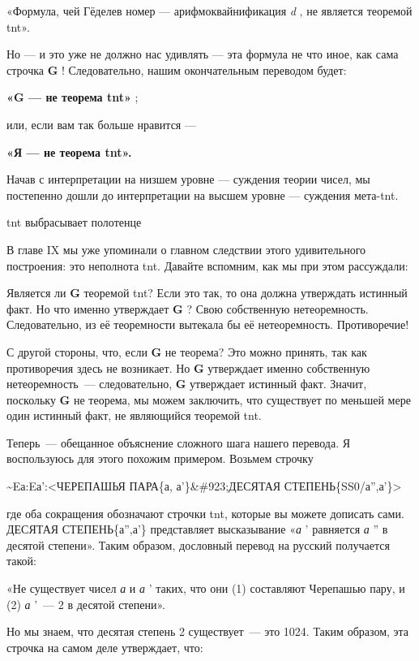 \documentclass[../main.tex]{subfiles}
\begin{document}
«Формула, чей Гёделев номер --- арифмоквайнификация \emph{d} , не является теоремой \acs{tnt}».

Но --- и это уже не должно нас удивлять --- эта формула не что иное, как сама строчка \textbf{G} ! Следовательно, нашим окончательным переводом будет:

\textbf{«G --- не теорема \acs{tnt}»} ;

или, если вам так больше нравится ---

\textbf{«Я --- не теорема \acs{tnt}».}

Начав с интерпретации на низшем уровне --- суждения теории чисел, мы постепенно дошли до интерпретации на высшем уровне --- суждения мета-\acs{tnt}.

\acs{tnt} выбрасывает полотенце

В главе IX мы уже упоминали о главном следствии этого удивительного построения: это неполнота \acs{tnt}\@. Давайте вспомним, как мы при этом рассуждали:

Является ли \textbf{G} теоремой \acs{tnt}? Если это так, то она должна утверждать истинный факт. Но что именно утверждает \textbf{G} ? Свою собственную нетеоремность. Следовательно, из её теоремности вытекала бы её нетеоремность. Противоречие!

С другой стороны, что, если \textbf{G} не теорема? Это можно принять, так как противоречия здесь не возникает. Но \textbf{G} утверждает именно собственную нетеоремность~--- следовательно, \textbf{G} утверждает истинный факт. Значит, поскольку \textbf{G} не теорема, мы можем заключить, что существует по меньшей мере один истинный факт, не являющийся теоремой \acs{tnt}.

Теперь~--- обещанное объяснение сложного шага нашего перевода. Я воспользуюсь для этого похожим примером. Возьмем строчку

\textasciitilde Eа:Eа':\textless ЧЕРЕПАШЬЯ ПАРА\{а, а'\}\&\#923;ДЕСЯТАЯ СТЕПЕНЬ\{SS0/а'',а'\}\textgreater{}

где оба сокращения обозначают строчки \acs{tnt}, которые вы можете дописать сами. ДЕСЯТАЯ СТЕПЕНЬ\{а'',а'\} представляет высказывание «\emph{а} ' равняется \emph{а} '' в десятой степени». Таким образом, дословный перевод на русский получается такой:

«Не существует чисел \emph{а} и \emph{а} ' таких, что они (1) составляют Черепашью пару, и (2) \emph{а} '~--- 2 в десятой степени».

Но мы знаем, что десятая степень 2 существует~--- это 1024. Таким образом, эта строчка на самом деле утверждает, что:
\end{document}
